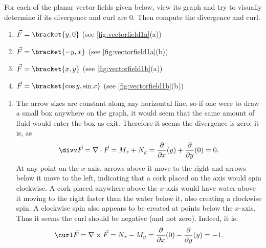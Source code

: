\begin{example}\label{ex_vectorfield1}
For each of the planar vector fields given below, view its graph and try to visually determine if its divergence and curl are 0. Then compute the divergence and curl.

\begin{enumerate}
	\item $\vec F =\bracket{y,0}$ (see \autoref{fig:vectorfield1a}(a))
	\item $\vec F =\bracket{-y,x}$ (see \autoref{fig:vectorfield1a}(b))
	\item $\vec F =\bracket{x,y}$ (see \autoref{fig:vectorfield1b}(a))
	\item $\vec F =\bracket{\cos y, \sin x}$ (see \autoref{fig:vectorfield1b}(b))
\end{enumerate}
\solution
\begin{enumerate}
	\item The arrow sizes are constant along any horizontal line, so if one were to draw a small box anywhere on the graph, it would seem that the same amount of fluid would enter the box as exit. Therefore it seems the divergence is zero; it is, as 
	\[
	\divv\vec F
	= \nabla \cdot \vec F
	= M_x + N_y
	= \frac{\partial}{\partial x}(y) + \frac{\partial}{\partial y}(0) = 0.
	\]
	At any point on the $x$-axis, arrows above it move to the right and arrows below it move to the left, indicating that a cork placed on the axis would spin clockwise. A cork placed anywhere above the $x$-axis would have water above it moving to the right faster than the water below it, also creating a clockwise spin. A clockwise spin also appears to be created at points below the $x$-axis. Thus it seems the curl should be negative (and not zero). Indeed, it is:
	\[
	\curl \vec F = \nabla\times\vec F
	= N_x-M_y = \frac{\partial}{\partial x}(0) - \frac{\partial}{\partial y}(y) = -1.
	\]
	

\end{enumerate}
\end{example}
